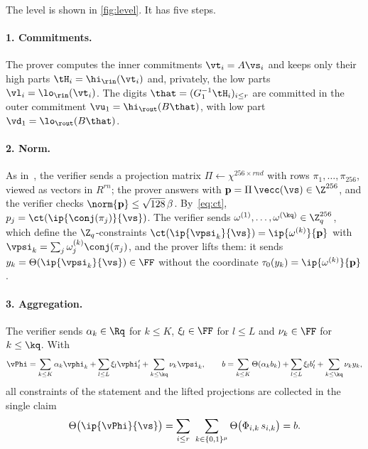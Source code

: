 The level is shown in \cref{fig:level}. It has five steps.

\paragraph{1. Commitments.}
The prover computes the inner commitments $\vt_i=A\vs_i$ and keeps only their high parts $\tH_i=\hi_{\rin}(\vt_i)$ and, privately, the low parts $\vl_i=\lo_{\rin}(\vt_i)$. The digits $\that=(G_1^{-1}\tH_i)_{i\le r}$ are committed in the outer commitment $\vu_1=\hi_{\rout}(B\that)$, with low part $\vd_1=\lo_{\rout}(B\that)$.

\paragraph{2. Norm.}
As in~\cite{BS23}, the verifier sends a projection matrix $\Pi\leftarrow\chi^{256\times rnd}$ with rows $\pi_1,\dots,\pi_{256}$, viewed as vectors in $R^{rn}$; the prover answers with $\mathbf p=\Pi\,\vecc(\vs)\in\Z^{256}$, and the verifier checks $\norm{\mathbf p}\le\sqrt{128}\,\beta$. By~\eqref{eq:ct}, $p_j=\ct(\ip{\conj(\pi_j)}{\vs})$. The verifier sends $\omega^{(1)},\dots,\omega^{(\kq)}\in\Z_q^{256}$, which define the $\Z_q$-constraints $\ct(\ip{\vpsi_k}{\vs})=\ip{\omega^{(k)}}{\mathbf p}$ with $\vpsi_k=\sum_j\omega^{(k)}_j\conj(\pi_j)$, and the prover lifts them: it sends $y_k=\Theta(\ip{\vpsi_k}{\vs})\in\FF$ without the coordinate $\tau_0(y_k)=\ip{\omega^{(k)}}{\mathbf p}$.

\paragraph{3. Aggregation.}
The verifier sends $\alpha_k\in\Rq$ for $k\le K$, $\xi_l\in\FF$ for $l\le L$ and $\nu_k\in\FF$ for $k\le\kq$. With
\begin{equation}\label{eq:agg}
\vPhi=\sum_{k\le K}\alpha_k\vphi_k+\sum_{l\le L}\xi_l\vphi'_l+\sum_{k\le\kq}\nu_k\vpsi_k,\qquad
b=\sum_{k\le K}\Theta(\alpha_kb_k)+\sum_{l\le L}\xi_lb'_l+\sum_{k\le\kq}\nu_ky_k ,
\end{equation}
all constraints of the statement and the lifted projections are collected in the single claim
\begin{equation}\label{eq:claim}
\Theta\bigl(\ip{\vPhi}{\vs}\bigr)=\sum_{i\le r}\ \sum_{k\in\{0,1\}^\mu}\Theta\bigl(\Phi_{i,k}\,s_{i,k}\bigr)=b .
\end{equation}

